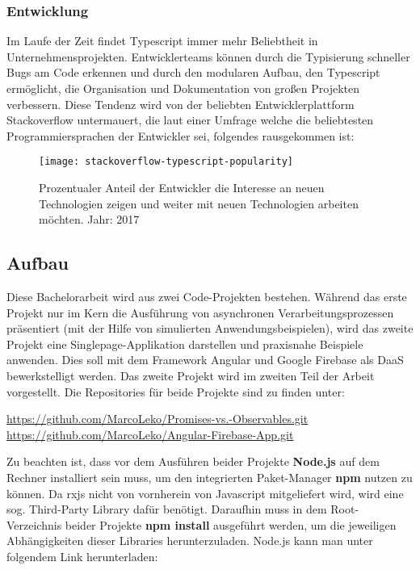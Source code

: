 \subsubsection{Entwicklung}
Im Laufe der Zeit findet Typescript immer mehr Beliebtheit in Unternehmensprojekten. Entwicklerteams können durch die Typisierung schneller Bugs am Code erkennen und durch den modularen Aufbau, den Typescript ermöglicht, die Organisation und Dokumentation von großen Projekten verbessern. Diese Tendenz wird von der beliebten Entwicklerplattform Stackoverflow untermauert, die laut einer Umfrage welche die beliebtesten Programmiersprachen der Entwickler sei, folgendes rausgekommen ist:

\begin{figure}[H]
\centering
\texttt{[image: stackoverflow-typescript-popularity]}
\caption{Prozentualer Anteil der Entwickler die Interesse an neuen Technologien zeigen und weiter mit neuen Technologien arbeiten möchten. Jahr: 2017 \cite{typescript-survey}}
\end{figure}

\subsection{Aufbau}
Diese Bachelorarbeit wird aus zwei Code-Projekten bestehen. Während das erste Projekt nur im Kern die Ausführung von asynchronen Verarbeitungsprozessen präsentiert (mit der Hilfe von simulierten Anwendungsbeispielen), wird das zweite Projekt eine Singlepage-Applikation darstellen und praxisnahe Beispiele anwenden. Dies soll mit dem Framework Angular und Google Firebase als DaaS bewerkstelligt werden. Das zweite Projekt wird im zweiten Teil der Arbeit vorgestellt. Die Repositories für beide Projekte sind zu finden unter: 

\begin{center}
\url{https://github.com/MarcoLeko/Promises-vs.-Observables.git} \\
\url{https://github.com/MarcoLeko/Angular-Firebase-App.git}
\end{center}

\noindent
Zu beachten ist, dass vor dem Ausführen beider Projekte \textbf{Node.js} auf dem Rechner installiert sein muss, um den integrierten Paket-Manager \textbf{npm} nutzen zu können. Da rxjs nicht von vornherein von Javascript mitgeliefert wird, wird eine sog. \glqq  Third-Party Library\grqq{} dafür benötigt. Daraufhin muss in dem Root-Verzeichnis beider Projekte \textbf{npm install} ausgeführt werden, um die jeweiligen Abhängigkeiten dieser Libraries herunterzuladen. Node.js kann man unter folgendem Link herunterladen:

